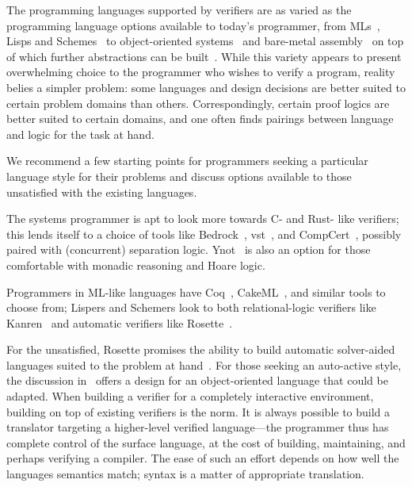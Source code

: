 The programming languages supported by verifiers are as varied as the
programming language options available to today's programmer, from
MLs~\cite{Coq,Kumar_2014}, Lisps and Schemes~\cite{Torlak_2013} to
object-oriented systems~\cite{leino2008specification,leino2010dafny} and
bare-metal assembly~\cite{Chlipala_2011} on top of which further abstractions
can be built~\cite{Chlipala_2015}. While this variety appears to present
overwhelming choice to the programmer who wishes to verify a program, reality
belies a simpler problem: some languages and design decisions are better suited
to certain problem domains than others. Correspondingly, certain proof logics
are better suited to certain domains, and one often finds pairings between
language and logic for the task at hand.

We recommend a few starting points for programmers seeking a particular language
style for their problems and discuss options available to those unsatisfied with
the existing languages.

The systems programmer is apt to look more towards C- and Rust- like verifiers; this
lends itself to a choice of tools like Bedrock~\cite{Chlipala_2011},
\gls{vst}~\cite{VST}, and CompCert~\cite{Kastner-LBSSF-2017}, possibly paired
with (concurrent) separation logic. Ynot~\cite{Nanevski08ynot:reasoning} is also
an option for those comfortable with monadic reasoning and Hoare logic.

Programmers in ML-like languages have Coq~\cite{Coq}, CakeML~\cite{Kumar_2014},
and similar tools to choose from; Lispers and Schemers look to both
relational-logic verifiers like Kanren~\cite{Byrd_2009} and automatic verifiers
like Rosette~\cite{Rosette}.

For the unsatisfied, Rosette promises the ability to build automatic
solver-aided languages suited to the problem at hand~\cite{Torlak_2013}. For
those seeking an auto-active style, the discussion
in~\cite{leino2008specification,Ahmadi_2014} offers a design for an
object-oriented language that could be adapted. When building a verifier for a
completely interactive environment, building on top of existing verifiers is the
norm. It is always possible to build a translator targeting a higher-level
verified language---the programmer thus has complete control of the surface
language, at the cost of building, maintaining, and perhaps verifying a
compiler. The ease of such an effort depends on how well the languages semantics
match; syntax is a matter of appropriate translation.
